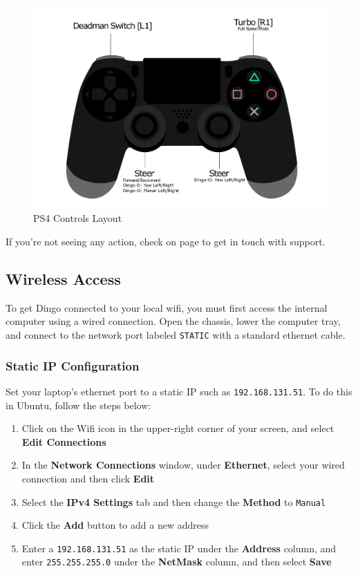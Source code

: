 \documentclass[]{clearpath-latex/clearpath-manual}
\begin{document}
\begin{figure}[H]
  \centering
  \includegraphics[width=0.75\linewidth]{dingo-sony-ps4-controller-labelled.pdf}
  \caption{PS4 Controls Layout}
  \label{ps4layout}
\end{figure}


If you're not seeing any action, check  on page \pageref{trouble} to
get in touch with support.

\subsection{Wireless Access}

To get Dingo connected to your local wifi, you must first access the internal computer
using a wired connection. Open the chassis, lower the computer tray, and connect to the network port
labeled \lstinline{STATIC} with a standard ethernet cable.

\subsubsection{Static IP Configuration}

Set your laptop's ethernet port to a static IP such as \lstinline{192.168.131.51}.  To do this in Ubuntu, follow the steps below:
\begin{enumerate}
  \item Click on the Wifi icon in the upper-right corner of your screen, and select \textbf{Edit Connections}
  \item In the \textbf{Network Connections} window, under \textbf{Ethernet}, select your wired connection and then click \textbf{Edit}
  \item Select the \textbf{IPv4 Settings} tab and then change the \textbf{Method} to \lstinline{Manual}
  \item Click the \textbf{Add} button to add a new address
  \item Enter a \lstinline{192.168.131.51} as the static IP under the \textbf{Address} column, and enter \lstinline{255.255.255.0} under the \textbf{NetMask} column, and then select \textbf{Save}
\end{enumerate}
\end{document}
